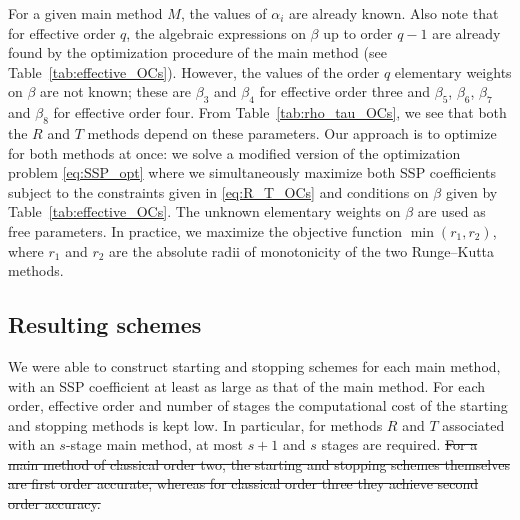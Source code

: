 For a given main method $M$, the values of $\alpha_i$ are already known.
Also note that for effective order $q$, the algebraic expressions on
$\beta$ up to order $q-1$ are already found by the optimization procedure of 
the main method (see Table~\ref{tab:effective_OCs}). 
However, the values of the order $q$ elementary weights on $\beta$ are not 
known; these are $\beta_3$ and $\beta_4$ for effective order three and
$\beta_5$, $\beta_6$, $\beta_7$ and $\beta_8$ for effective order four.
From Table~\ref{tab:rho_tau_OCs}, we see that both the $R$ and $T$
methods depend on these parameters.
Our approach is to optimize for both methods at once: we solve a
modified version of the optimization problem \eqref{eq:SSP_opt} where
we simultaneously maximize both SSP coefficients subject to the
constraints given in \eqref{eq:R_T_OCs} and conditions on $\beta$ given by 
Table~\ref{tab:effective_OCs}. 
The unknown elementary weights on $\beta$ are used as free parameters.
In practice, we maximize the objective function $\min(r_1,r_2)$, where $r_1$ 
and $r_2$ are the absolute radii of monotonicity of the two Runge--Kutta 
methods.

\subsection{Resulting schemes}\label{subsec:resulting_schemes}
We were able to construct starting and stopping schemes for each main 
method, with an SSP coefficient at least as large as that of the main method.
For each order, effective order and number of stages the computational cost
of the starting and stopping methods is kept low. 
In particular, for methods $R$ and $T$ associated with an $s$-stage main method,
at most $s + 1$ and $s$ stages are required.
\sout{
For a main method of classical order two, the starting and stopping schemes 
themselves are first order accurate, whereas for classical order three they 
achieve second order accuracy. 
}

